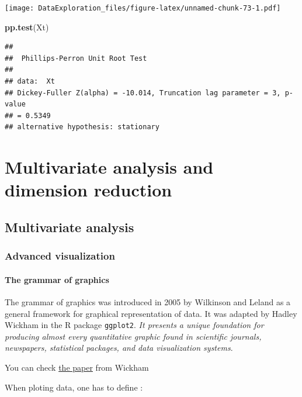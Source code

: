 \documentclass[
]{book}
\newenvironment{Shaded}{\begin{snugshade}}{\end{snugshade}}
\newcommand{\KeywordTok}[1]{\textcolor[rgb]{0.13,0.29,0.53}{\textbf{#1}}}
\newcommand{\NormalTok}[1]{#1}
\begin{document}
\texttt{[image: DataExploration\_files/figure-latex/unnamed-chunk-73-1.pdf]}

\begin{Shaded}
\begin{Highlighting}[]
\KeywordTok{pp.test}\NormalTok{(Xt)}
\end{Highlighting}
\end{Shaded}

\begin{verbatim}
## 
## 	Phillips-Perron Unit Root Test
## 
## data:  Xt
## Dickey-Fuller Z(alpha) = -10.014, Truncation lag parameter = 3, p-value
## = 0.5349
## alternative hypothesis: stationary
\end{verbatim}

\hypertarget{multivar}{%
\chapter{Multivariate analysis and dimension reduction}\label{multivar}}

\hypertarget{multivariate-analysis}{%
\section{Multivariate analysis}\label{multivariate-analysis}}

\hypertarget{advanced-visualization}{%
\subsection{Advanced visualization}\label{advanced-visualization}}

\hypertarget{the-grammar-of-graphics}{%
\subsubsection{The grammar of graphics}\label{the-grammar-of-graphics}}

The grammar of graphics was introduced in 2005 by Wilkinson and Leland as a general framework for graphical representation of data. It was adapted by Hadley Wickham in the R package \texttt{ggplot2}.
\emph{It presents a unique foundation for producing almost every quantitative graphic found in scientific journals, newspapers, statistical packages, and data visualization systems}.

You can check \href{https://vita.had.co.nz/papers/layered-grammar.html}{the paper} from Wickham

When ploting data, one has to define :
\end{document}
